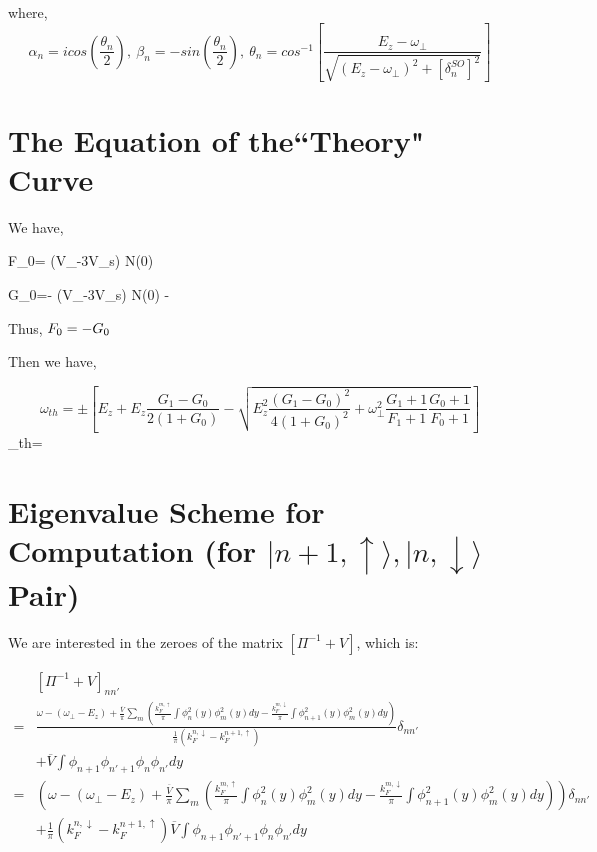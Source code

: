 where,
\[\alpha_n=i cos\left(\frac{\theta_n}{2}\right),\ \beta_n=-sin\left(\frac{\theta_n}{2}\right),\ \theta_n =cos^{-1}\left[\frac{E_z-\omega_{\perp}}{\sqrt{(E_z-\omega_{\perp})^2+\left[\delta_n^{SO}\right]^2}}\right] \]

\section{The Equation of the``Theory" Curve}

We have, 

\be F_0= (V_\rho-3V_s) N(0) \equiv {}   \ee

\be G_0=- (V_\rho-3V_s) N(0) \equiv -   \ee

Thus, $F_0=-G_0 \\$

Then we have,

\[ \omega_{th}=\pm \left[ {E_z + E_z \frac{G_1-G_0}{2(1+G_0)} - \sqrt{E_z^2 \frac{(G_1-G_0)^2}{4(1+G_0)^2}+\omega_{\perp}^2 \frac{G_1+1}{F_1+1} \frac{G_0+1}{F_0+1}}} \right] \]
\be \Rightarrow \omega_{th}= \pm {}\ee

\section{Eigenvalue Scheme for Computation (for $|n+1,\uparrow\rangle , |n,\downarrow\rangle$ Pair)}

We are interested in the zeroes of the matrix $\left[ \Pi^{-1}+V \right]$, which is:

\begin{align*}
& \left[ \Pi^{-1}+V \right]_{nn'} \\ 
= &\frac{\omega-(\omega_{\perp}-E_z)+\frac{\overline{V}}{\pi} \sum\limits_m \left( \frac{k_F^{m,\uparrow}}{\pi}\int\phi_n^2(y)\phi_m^2(y)dy - \frac{k_F^{m,\downarrow}}{\pi}\int\phi_{n+1}^2(y)\phi_m^2(y)dy \right)}{\frac{1}{\pi} \left( k_F^{n,\downarrow}-k_F^{n+1,\uparrow} \right)} \delta_{nn'} \\
&+ \overline{V} \int\phi_{n+1}\phi_{n'+1}\phi_n\phi_{n'} dy \\
 = &\left( \omega-(\omega_{\perp}-E_z)+\frac{\overline{V}}{\pi} \sum\limits_m \left( \frac{k_F^{m,\uparrow}}{\pi}\int\phi_n^2(y)\phi_m^2(y)dy - \frac{k_F^{m,\downarrow}}{\pi}\int\phi_{n+1}^2(y)\phi_m^2(y)dy \right) \right)\delta_{nn'} \\
 &+ \frac{1}{\pi} \left( k_F^{n,\downarrow}-k_F^{n+1,\uparrow} \right) \overline{V} \int\phi_{n+1}\phi_{n'+1}\phi_n\phi_{n'} dy 
\end{align*}

